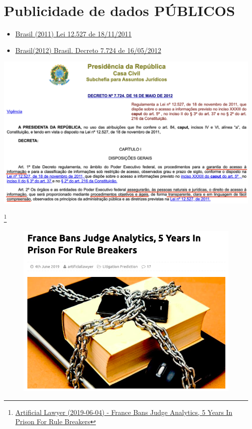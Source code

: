 \documentclass{beamer}\usepackage[]{graphicx}\usepackage[]{xcolor}
\newcommand\blfootnote[1]{%
  \begingroup
  \renewcommand\thefootnote{}\footnote{#1}%
  \addtocounter{footnote}{-1}%
  \endgroup
}
\begin{document}
\section{Publicidade de dados PÚBLICOS}
\begin{frame}{\secname}
  \begin{itemize}
    \item \href{http://www.planalto.gov.br/ccivil_03/_ato2011-2014/2011/lei/l12527.htm}{Brasil (2011) Lei 12.527 de 18/11/2011}
    \item \href{http://www.planalto.gov.br/ccivil_03/_ato2011-2014/2012/Decreto/D7724.htm}{Brasil(2012) Brasil. Decreto 7.724 de 16/05/2012}
	\end{itemize}
	\begin{center}
  \includegraphics[scale=0.3]{lai12.png}
  \end{center}
\end{frame}

\begin{frame}{\secname}
\blfootnote{\tiny{\href{https://www.artificiallawyer.com/2019/06/04/france-bans-judge-analytics-5-years-in-prison-for-rule-breakers/}{Artificial Lawyer (2019-06-04) - France Bans Judge Analytics, 5 Years In Prison For Rule Breakers}}}
\begin{figure}
\includegraphics[scale=0.35]{franca}
\end{figure}
\end{frame}
\end{document}
